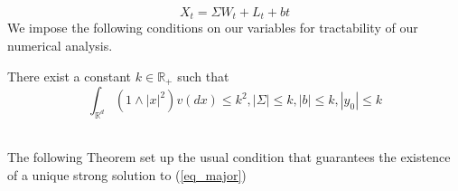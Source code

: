 \begin{equation}
X_t = \Sigma W_t + L_t + bt
\end{equation}We impose the following conditions on our variables for tractability of our numerical analysis. 
\begin{assumption} There exist a constant $k \in \mathbb{R}_+$ such that 
\begin{equation*}
\int_{\mathbb{R}^d} (1 \land |x|^2)  v(dx) \leq k^2, |\Sigma|\leq k, |b|\leq k, |y_0|\leq k
\end{equation*}
\end{assumption}\\
The following Theorem set up the usual condition that guarantees the existence of
 a unique strong solution to (\ref{eq_major}) 








